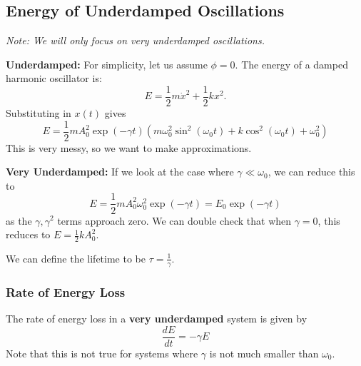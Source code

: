 \documentclass{article}
\begin{document}
\subsection{Energy of Underdamped Oscillations}
\textit{Note: We will only focus on very underdamped oscillations.}

\textbf{Underdamped:} For simplicity, let us assume $\phi=0.$ The energy of a damped harmonic oscillator is: 
\begin{equation}
    E = \frac{1}{2}m\dot{x}^2 + \frac{1}{2}kx^2.
\end{equation}
Substituting in $x(t)$ gives 
\begin{equation}
    E = \frac{1}{2}mA_0^2\exp\left(-\gamma t\right)(m\omega_0^2\sin^2(\omega_0t)+k\cos^2(\omega_0t)+\omega_0^2)
\end{equation}
This is very messy, so we want to make approximations.

\textbf{Very Underdamped:} If we look at the case where $\gamma \ll \omega_0$, we can reduce this to
\begin{equation}
    \boxed{E = \frac{1}{2}mA_0^2\omega_0^2\exp\left(-\gamma t\right) = E_0\exp(-\gamma t)}
\end{equation}
as the $\gamma,\gamma^2$ terms approach zero. We can double check that when $\gamma = 0$, this reduces to $E = \frac{1}{2}kA_0^2.$

We can define the lifetime to be $\tau = \frac{1}{\gamma}$.
\subsubsection{Rate of Energy Loss}
The rate of energy loss in a \textbf{very underdamped} system is given by 
\begin{equation}
    \frac{dE}{dt} = -\gamma E
\end{equation}
Note that this is not true for systems where $\gamma$ is not much smaller than $\omega_0.$
\end{document}
